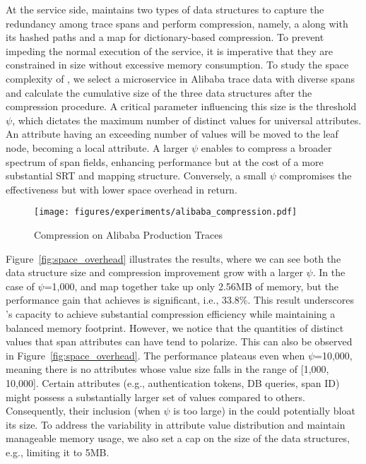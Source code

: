 At the service side, \alias maintains two types of data structures to capture the redundancy among trace spans and perform compression, namely, a \sname along with its hashed paths and a map for dictionary-based compression.
To prevent impeding the normal execution of the service, it is imperative that they are constrained in size without excessive memory consumption.
To study the space complexity of \alias, we select a microservice in Alibaba trace data with diverse spans and calculate the cumulative size of the three data structures after the compression procedure.
A critical parameter influencing this size is the threshold $\psi$, which dictates the maximum number of distinct values for universal attributes.
An attribute having an exceeding number of values will be moved to the leaf node, becoming a local attribute.
A larger $\psi$ enables \alias to compress a broader spectrum of span fields, enhancing performance but at the cost of a more substantial SRT and mapping structure.
Conversely, a small $\psi$ compromises the effectiveness but with lower space overhead in return.

\begin{figure}[t]
    \centering
    \texttt{[image: figures/experiments/alibaba\_compression.pdf]}
    \caption{Compression on Alibaba Production Traces}
    \label{fig:alibaba_compression}
\end{figure}

Figure~\ref{fig:space_overhead} illustrates the results, where we can see both the data structure size and compression improvement grow with a larger $\psi$.
In the case of $\psi$=1,000, \sname and map together take up only 2.56MB of memory, but the performance gain that \alias achieves is significant, i.e., 33.8\%.
This result underscores \alias's capacity to achieve substantial compression efficiency while maintaining a balanced memory footprint.
However, we notice that the quantities of distinct values that span attributes can have tend to polarize.
This can also be observed in Figure~\ref{fig:space_overhead}.
The performance plateaus even when $\psi$=10,000, meaning there is no attributes whose value size falls in the range of [1,000, 10,000].
Certain attributes (e.g., authentication tokens, DB queries, span ID) might possess a substantially larger set of values compared to others.
Consequently, their inclusion (when $\psi$ is too large) in the \sname could potentially bloat its size.
To address the variability in attribute value distribution and maintain manageable memory usage, we also set a cap on the size of the data structures, e.g., limiting it to 5MB.

